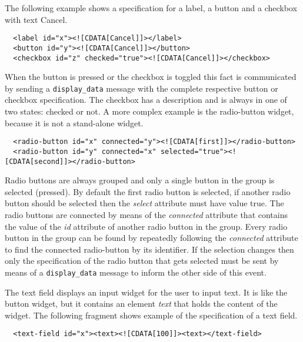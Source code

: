 \documentclass{article}
\newcommand{\msg}[1]{\texttt{#1}}
\begin{document}
    The following example shows a specification for a label, a button and a
    checkbox with text Cancel.
   
    \small \begin{verbatim}
  <label id="x"><![CDATA[Cancel]]></label>
  <button id="y"><![CDATA[Cancel]]></button>
  <checkbox id="z" checked="true"><![CDATA[Cancel]]></checkbox>\end{verbatim}
  \normalsize

    \noindent When the button is pressed or the checkbox is toggled this fact is
    communicated by sending a \msg{display\_data} message with the complete
    respective button or checkbox specification. The checkbox has a description
    and is always in one of two states: checked or not. A more complex example
    is the radio-button widget, because it is not a stand-alone widget.

    \small \begin{verbatim}
  <radio-button id="x" connected="y"><![CDATA[first]]></radio-button>
  <radio-button id="y" connected="x" selected="true"><![CDATA[second]]></radio-button>\end{verbatim}
  \normalsize

   \noindent Radio buttons are always grouped and only a single button in the
   group is selected (pressed).  By default the first radio button is selected,
   if another radio button should be selected then the \textit{select}
   attribute must have value true. The radio buttons are connected by means of
   the \textit{connected} attribute that contains the value of the \textit{id}
   attribute of another radio button in the group. Every radio button in the
   group can be found by repeatedly following the \textit{connected} attribute
   to find the connected radio-button by its identifier. If the selection
   changes then only the specification of the radio button that gets selected
   must be sent by means of a \msg{display\_data} message to inform the other
   side of this event.

   The text field displays an input widget for the user to input text. It is
   like the button widget, but it contains an element \textit{text} that
   holds the content of the widget. The following fragment shows example of
   the specification of a text field.
   
   \small \begin{verbatim}
  <text-field id="x"><text><![CDATA[100]]><text></text-field>\end{verbatim}
  \normalsize
\end{document}
